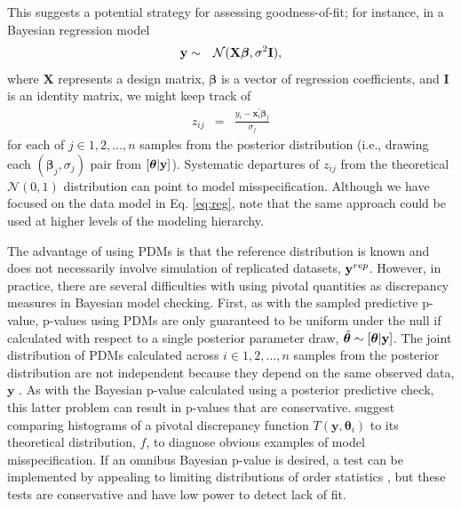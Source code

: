 \documentclass[12pt,english]{article}
\begin{document}
\begin{spacing}{1.9}
This suggests a potential strategy for assessing goodness-of-fit; for
instance, in a Bayesian regression model
\begin{eqnarray}
  \label{eq:reg}
  {\bf y} & \sim & \mathcal{N}(\textbf{X} \boldsymbol{\beta},\sigma^2 \textbf{I}),
\end{eqnarray}
where $\textbf{X}$ represents a design matrix, $\boldsymbol{\beta}$ is
a vector of regression coefficients, and $\textbf{I}$ is an identity
matrix, we might keep track of
\begin{eqnarray}
  \label{eq:resid}
  z_{ij} & = & \frac{y_i - \textbf{x}_i^\prime \boldsymbol{\beta}_j}{\sigma_j}
\end{eqnarray}
for each of $j \in {1, 2, \hdots, n}$ samples from the posterior
distribution (i.e., drawing each $(\boldsymbol{\beta}_j, \sigma_j)$
pair from $[\boldsymbol{\theta}|{\bf y}]$).  Systematic departures of
$z_{ij}$ from the theoretical $\mathcal{N}(0,1)$ distribution can
point to model misspecification.  Although we have focused on the data
model in Eq. \ref{eq:reg}, note that the same approach could be used
at higher levels of the modeling hierarchy.

The advantage of using PDMs is that the reference distribution is
known and does not necessarily involve simulation of replicated
datasets, ${\bf y}^{rep}$.  However, in practice, there are several
difficulties with using pivotal quantities as discrepancy measures in
Bayesian model checking.  First, as with the sampled predictive
p-value, p-values using PDMs are only guaranteed to be uniform under
the null if calculated with respect to a single posterior parameter
draw, $\tilde{\boldsymbol{\theta}} \sim [\boldsymbol{\theta} | {\bf y}]$.  The joint
distribution of PDMs calculated across $i \in 1,2,\hdots,n$ samples
from the posterior distribution are not independent because they
depend on the same observed data, $\textbf{y}$ \citep{Johnson2004}.
As with the Bayesian p-value calculated using a posterior predictive
check, this latter problem can result in p-values that are
conservative.  \citet{YuanJohnson2012} suggest comparing histograms of
a pivotal discrepancy function $T(\textbf{y},\boldsymbol{\theta}_i)$
to its theoretical distribution, $f$, to diagnose obvious examples of
model misspecification.  If an omnibus Bayesian p-value is desired, a
test can be implemented by appealing to limiting distributions of
order statistics \citep{Johnson2004}, but these tests are conservative
and have low power to detect lack of fit.


\end{spacing}
\end{document}
